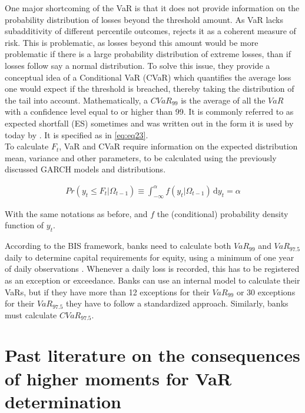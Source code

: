 \documentclass[a4paper, nobind]{templates/ociamthesis}
\begin{document}
\noindent One major shortcoming of the VaR is that it does not provide information on the probability distribution of losses beyond the threshold amount. As VaR lacks subadditivity of different percentile outcomes, \textcite{artzner1996} rejects it as a coherent measure of risk. This is problematic, as losses beyond this amount would be more problematic if there is a large probability distribution of extreme losses, than if losses follow say a normal distribution. To solve this issue, they provide a conceptual idea of a Conditional VaR (CVaR) which quantifies the average loss one would expect if the threshold is breached, thereby taking the distribution of the tail into account. Mathematically, a \(CVaR_{99}\) is the average of all the \(VaR\) with a confidence level equal to or higher than 99. It is commonly referred to as expected shortfall (ES) sometimes and was written out in the form it is used by today by \autocite{bertsimas2004}. It is specified as in \eqref{eq:eq23}.~\\

\noindent To calculate \(F_t\), VaR and CVaR require information on the expected distribution mean, variance and other parameters, to be calculated using the previously discussed GARCH models and distributions.

\begin{align}
Pr(y_t \le F_t | \Omega_{t-1}) \equiv \int_{-\infty}^{\alpha} \! f(y_t | \Omega_{t-1}) \, \mathrm{d}y_t = \alpha
 \label{eq:eq23}
\end{align}

\noindent With the same notations as before, and \(f\) the (conditional) probability density function of \(y_t\).

\noindent According to the BIS framework, banks need to calculate both \(VaR_{99}\) and \(VaR_{97.5}\) daily to determine capital requirements for equity, using a minimum of one year of daily observations \autocite{baselcommitteeonbankingsupervision2016}. Whenever a daily loss is recorded, this has to be registered as an exception or exceedance. Banks can use an internal model to calculate their VaRs, but if they have more than 12 exceptions for their \(VaR_{99}\) or 30 exceptions for their \(VaR_{97.5}\) they have to follow a standardized approach. Similarly, banks must calculate \(CVaR_{97.5}\).

\hypertarget{past-lit}{%
\section{Past literature on the consequences of higher moments for VaR determination}\label{past-lit}}
\end{document}
